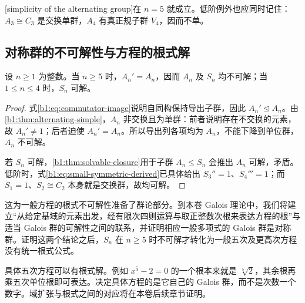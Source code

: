 [simplicity of the alternating group]在 \(n=5\) 就成立。低阶例外也应同时记住：\(A_3\cong C_3\) 是交换单群，\(A_4\) 有真正规子群 \(V_4\)，因而不单。

\subsection{对称群的不可解性与方程的根式解}
\label{b1:subsec:0704:03}

\begin{corollary}[对称群的可解性判据]\label{b1:cor:symmetric-nonsolvable}
	设 \(n\geq1\) 为整数。当 \(n\geq5\) 时，\(A_n'=A_n\)，因而 \(A_n\) 及 \(S_n\) 均不可解；当 \(1\leq n\leq4\) 时，\(S_n\) 可解。
\end{corollary}

\begin{proof}
	式\eqref{b1:eq:commutator-image}说明自同构保持导出子群，因此 \(A_n'\trianglelefteq A_n\)。由\cref{b1:thm:alternating-simple}，\(A_n\) 非交换且为单群：前者说明存在不交换的元素，故 \(A_n'\ne1\)；后者迫使 \(A_n'=A_n\)。所以导出列各项均为 \(A_n\)，不能下降到单位群，\(A_n\) 不可解。

	若 \(S_n\) 可解，\cref{b1:thm:solvable-closure}用于子群 \(A_n\le S_n\) 会推出 \(A_n\) 可解，矛盾。低阶时，式\eqref{b1:eq:small-symmetric-derived}已具体给出 \(S_3''=1\)、\(S_4'''=1\)；而 \(S_1=1\)、\(S_2\cong C_2\) 本身就是交换群，故均可解。
\end{proof}

这为一般方程的根式不可解性准备了群论部分。到本卷 Galois 理论中，我们将建立“从给定基域的元素出发，经有限次四则运算与取正整数次根来表达方程的根”与适当 Galois 群的可解性之间的联系，并证明相应一般多项式的 Galois 群是对称群。证明这两个结论之后，\(S_n\) 在 \(n\ge5\) 时不可解才转化为一般五次及更高次方程没有统一根式公式。

\ProseParagraphBreak
具体五次方程可以有根式解。例如 \(x^5-2=0\) 的一个根本来就是 \(\sqrt[5]{2}\)，其余根再乘五次单位根即可表达。决定具体方程的是它自己的 Galois 群，而不是次数一个数字。域扩张与根式之间的对应将在本卷后续章节证明。
